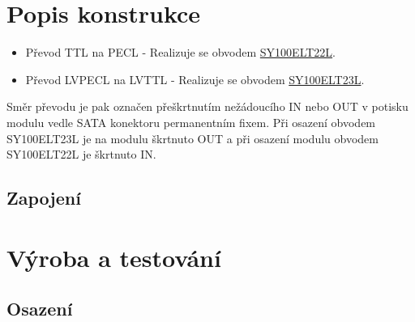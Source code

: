 \documentclass[12pt,a4paper,oneside]{article}
\begin{document}
\newpage
\section{Popis konstrukce}

\begin{itemize}
\item
  Převod TTL na PECL - Realizuje se obvodem
  \href{http://www.micrel.com/page.do?page=/product-info/products/sy10-100elt22l.shtml}{SY100ELT22L}.
\item
  Převod LVPECL na LVTTL - Realizuje se obvodem
  \href{http://www.micrel.com/page.do?page=/product-info/products/sy10-100elt23l.shtml}{SY100ELT23L}.
\end{itemize}
Směr převodu je pak označen přeškrtnutím nežádoucího IN nebo OUT v
potisku modulu vedle SATA konektoru permanentním fixem. Při osazení obvodem SY100ELT23L je na modulu škrtnuto OUT a při osazení modulu obvodem SY100ELT22L je škrtnuto IN. 

\subsection{Zapojení}



\section{Výroba a testování}

\subsection{Osazení}
\end{document}
